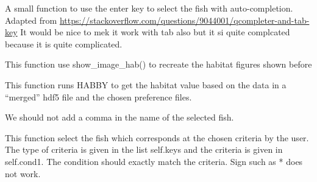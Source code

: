 \documentclass[letterpaper,10pt,english]{sphinxmanual}
\begin{document}
\begin{fulllineitems}
\begin{fulllineitems}
\end{fulllineitems}


\begin{fulllineitems}
\label{\detokenize{index:src_GUI.bio_info_GUI.BioInfo.next_completion}}
A small function to use the enter key to select the fish with auto-completion.
Adapted from \url{https://stackoverflow.com/questions/9044001/qcompleter-and-tab-key}
It would be nice to mek it work with tab also but it si quite complcated because it is quite complicated.

\end{fulllineitems}


\begin{fulllineitems}
\label{\detokenize{index:src_GUI.bio_info_GUI.BioInfo.recreate_fig}}
This function use show\_image\_hab() to recreate the habitat figures shown before

\end{fulllineitems}


\begin{fulllineitems}
\label{\detokenize{index:src_GUI.bio_info_GUI.BioInfo.run_habitat_value}}
This function runs HABBY to get the habitat value based on the data in a ``merged'' hdf5 file and the chosen
preference files.

We should not add a comma in the name of the selected fish.

\end{fulllineitems}


\begin{fulllineitems}
\label{\detokenize{index:src_GUI.bio_info_GUI.BioInfo.select_fish}}
This function select the fish which corresponds at the chosen criteria by the user. The type of criteria
is given in the list self.keys and the criteria is given in self.cond1. The condition should exactly
match the criteria. Sign such as * does not work.


\end{fulllineitems}
\end{fulllineitems}
\end{document}
